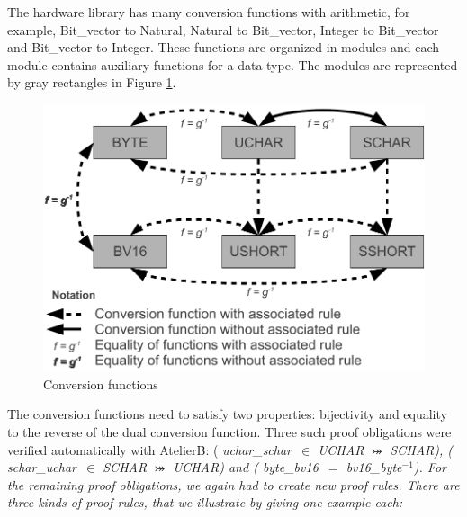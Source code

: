 \documentclass[a4paper]{llncs}
\begin{document}
The hardware library has many conversion functions with
arithmetic,  for example, Bit\_vector to Natural, Natural to
Bit\_vector, Integer to Bit\_vector and Bit\_vector to Integer. These
functions are organized in modules and each module contains auxiliary
functions for a data type. The modules are represented by gray
rectangles in Figure \ref{DiagramTypesRules}.

\begin{figure}[he]
\centering
\includegraphics[width=3.in]{images/Diagram_Types_and_Rules.pdf}
\caption{Conversion functions}
\label{DiagramTypesRules}
\end{figure}


The conversion functions need to satisfy two properties: bijectivity
and equality to the reverse of the dual conversion function. Three
such proof obligations were verified automatically with AtelierB: (\it
uchar\_schar\rm \ $\in$ \textit{UCHAR} $\bij$ \textit{SCHAR}), (\it
schar\_uchar\rm \ $\in$ \textit{SCHAR} $\bij$ \textit{UCHAR}) and (\it
byte\_bv16\rm \ $=$ \it bv16\_byte\rm $^{-1}$).
%
%
For the remaining proof obligations, we again had to create new proof
rules. There are three kinds of proof rules, that we illustrate by giving
one example each:
\end{document}
